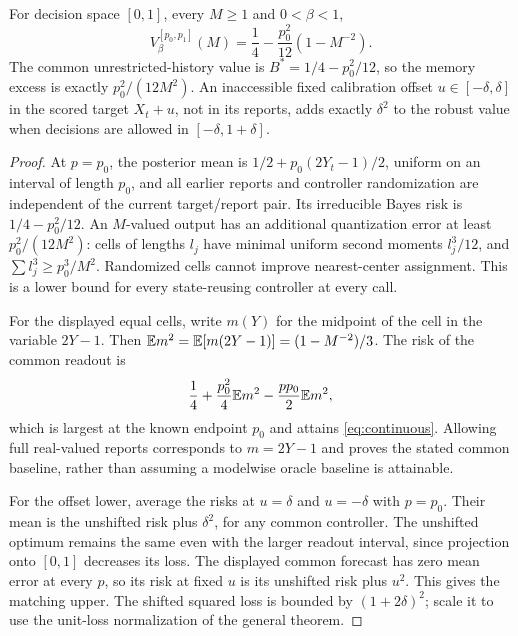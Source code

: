 \begin{proposition}\label{prop:continuous}
For decision space $[0,1]$, every $M\ge1$ and $0<\beta<1$,
\begin{equation}\label{eq:continuous}
 V_\beta^{[p_0,p_1]}(M)
 =\frac14-\frac{p_0^2}{12}(1-M^{-2}).
\end{equation}
The common unrestricted-history value is $B^*=1/4-p_0^2/12$, so the memory excess is exactly $p_0^2/(12M^2)$. An inaccessible fixed calibration offset $u\in[-\delta,\delta]$ in the scored target $X_t+u$, not in its reports, adds exactly $\delta^2$ to the robust value when decisions are allowed in $[-\delta,1+\delta]$.
\end{proposition}
\begin{proof}
At $p=p_0$, the posterior mean is $1/2+p_0(2Y_t-1)/2$, uniform on an interval of length $p_0$, and all earlier reports and controller randomization are independent of the current target/report pair. Its irreducible Bayes risk is $1/4-p_0^2/12$. An $M$-valued output has an additional quantization error at least $p_0^2/(12M^2)$: cells of lengths $l_j$ have minimal uniform second moments $l_j^3/12$, and $\sum l_j^3\ge p_0^3/M^2$. Randomized cells cannot improve nearest-center assignment. This is a lower bound for every state-reusing controller at every call.

For the displayed equal cells, write $m(Y)$ for the midpoint of the cell in the variable $2Y-1$. Then $\mathbb E m^2=\mathbb E[m(2Y-1)]=(1-M^{-2})/3$. The risk of the common readout is
\[
 \frac14+\frac{p_0^2}{4}\mathbb E m^2-\frac{pp_0}{2}\mathbb E m^2,
\]
which is largest at the known endpoint $p_0$ and attains \eqref{eq:continuous}. Allowing full real-valued reports corresponds to $m=2Y-1$ and proves the stated common baseline, rather than assuming a modelwise oracle baseline is attainable.

For the offset lower, average the risks at $u=\delta$ and $u=-\delta$ with $p=p_0$. Their mean is the unshifted risk plus $\delta^2$, for any common controller. The unshifted optimum remains the same even with the larger readout interval, since projection onto $[0,1]$ decreases its loss. The displayed common forecast has zero mean error at every $p$, so its risk at fixed $u$ is its unshifted risk plus $u^2$. This gives the matching upper. The shifted squared loss is bounded by $(1+2\delta)^2$; scale it to use the unit-loss normalization of the general theorem.
\end{proof}

